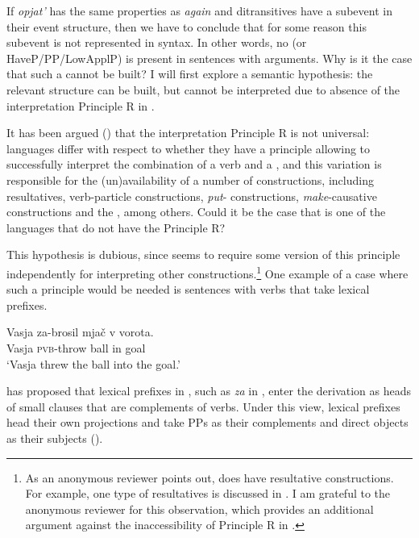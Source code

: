 \documentclass[output=paper]{langscibook}
\begin{document}
If  \textit{opjat’} has the same properties as  \textit{again} and  ditransitives have a  subevent in their event structure, then we have to conclude that for some reason this  subevent is not represented in syntax. In other words, no  (or HaveP\slash PP\slash LowApplP) is present in   sentences with  arguments. Why is it the case that such a  cannot be built? I will first explore a semantic hypothesis: the relevant structure can be built, but cannot be interpreted due to absence of the interpretation Principle R in .



It has been argued (\citealt{Snyder2001,Beck-Snyder2001,Beck2005}) that the interpretation Principle R is not universal: languages differ with respect to whether they have a principle allowing to successfully interpret the combination of a verb and a , and this variation is responsible for the (un)availability of a number of constructions, including resultatives, verb-particle constructions, \textit{put}{}- constructions, \textit{make}{}-causative constructions and the , among others. Could it be the case that  is one of the languages that do not have the Principle R?



This hypothesis is dubious, since  seems to require some version of this principle independently for interpreting other constructions.\footnote{As an anonymous reviewer points out,  does have resultative constructions. For example, one type of  resultatives is discussed in \citet{Tatevosov2010}. I am grateful to the anonymous reviewer for this observation, which provides an additional argument against the inaccessibility of Principle R in .} One example of a case where such a principle would be needed is sentences with verbs that take lexical prefixes.


 \ea\label{ex:bondarenko:29}
\gll Vasja za-brosil mjač v vorota.\\
     Vasja \textsc{pvb}-throw ball in goal\\
\glt `Vasja threw the ball into the goal.'
\z


\noindent \citet{Svenonius2004} has proposed that lexical prefixes in , such as \textit{za} in , enter the derivation as heads of small clauses that are complements of verbs. Under this view, lexical prefixes head their own projections and take PPs as their complements and direct objects as their subjects ().
\end{document}
